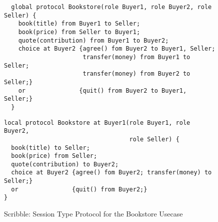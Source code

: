 \begin{figure}[t]
\begin{lstlisting}
  global protocol Bookstore(role Buyer1, role Buyer2, role Seller) {
    book(title) from Buyer1 to Seller;
    book(price) from Seller to Buyer1;
    quote(contribution) from Buyer1 to Buyer2;
    choice at Buyer2 {agree() fom Buyer2 to Buyer1, Seller;
                      transfer(money) from Buyer1 to Seller;
                      transfer(money) from Buyer2 to Seller;}
    or               {quit() from Buyer2 to Buyer1, Seller;}
  }
\end{lstlisting}


\begin{lstlisting}
local protocol Bookstore at Buyer1(role Buyer1, role Buyer2,
                                   role Seller) {
  book(title) to Seller;
  book(price) from Seller;
  quote(contribution) to Buyer2;
  choice at Buyer2 {agree() fom Buyer2; transfer(money) to Seller;}
  or               {quit() from Buyer2;}
}
\end{lstlisting}

\caption{Scribble: Session Type Protocol for the Bookstore Usecase}
\label{fig:scribble_bs}
\end{figure}
